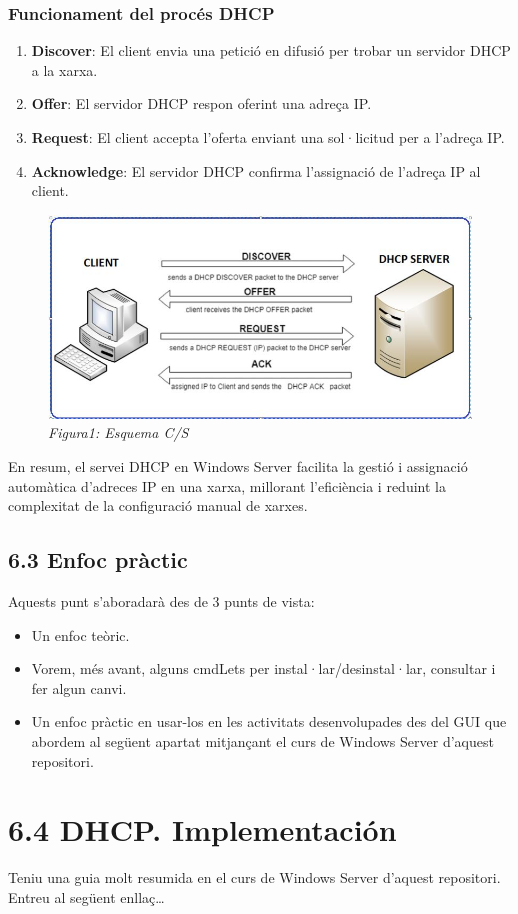 \documentclass[
  a4paper,
]{article}
\providecommand{\tightlist}{%
  \setlength{\itemsep}{0pt}\setlength{\parskip}{0pt}}
\begin{document}
\subsubsection{Funcionament del procés
DHCP}\label{funcionament-del-procuxe9s-dhcp}

\begin{enumerate}
\def\labelenumi{\arabic{enumi}.}
\tightlist
\item
  \textbf{Discover}: El client envia una petició en difusió per trobar
  un servidor DHCP a la xarxa.
\item
  \textbf{Offer}: El servidor DHCP respon oferint una adreça IP.
\item
  \textbf{Request}: El client accepta l'oferta enviant una sol·licitud
  per a l'adreça IP.
\item
  \textbf{Acknowledge}: El servidor DHCP confirma l'assignació de
  l'adreça IP al client.
\end{enumerate}

\begin{figure}
\centering
\includegraphics{png/DHCPesquema.jpg}
\caption{\emph{Figura1: Esquema C/S}}
\end{figure}

En resum, el servei DHCP en Windows Server facilita la gestió i
assignació automàtica d'adreces IP en una xarxa, millorant l'eficiència
i reduint la complexitat de la configuració manual de xarxes.

\subsection{6.3 Enfoc pràctic}\label{enfoc-pruxe0ctic}

Aquests punt s'aboradarà des de 3 punts de vista:

\begin{itemize}
\tightlist
\item
  Un enfoc teòric.
\item
  Vorem, més avant, alguns cmdLets per instal·lar/desinstal·lar,
  consultar i fer algun canvi.
\item
  Un enfoc pràctic en usar-los en les activitats desenvolupades des del
  GUI que abordem al següent apartat mitjançant el curs de Windows
  Server d'aquest repositori.
\end{itemize}

\section{6.4 DHCP. Implementación}\label{dhcp.-implementaciuxf3n}

Teniu una guia molt resumida en el curs de Windows Server d'aquest
repositori. Entreu al següent enllaç\ldots{}

\href{https://github.com/tofermos/Windows-Server/blob/main/md/DHCP.md}{}
\end{document}
